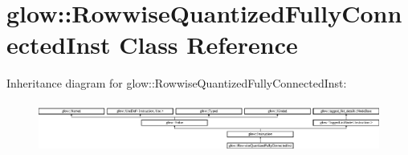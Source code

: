 \hypertarget{classglow_1_1_rowwise_quantized_fully_connected_inst}{}\section{glow\+:\+:Rowwise\+Quantized\+Fully\+Connected\+Inst Class Reference}
\label{classglow_1_1_rowwise_quantized_fully_connected_inst}
Inheritance diagram for glow\+:\+:Rowwise\+Quantized\+Fully\+Connected\+Inst\+:\begin{figure}[H]
\begin{center}
\leavevmode
\includegraphics[height=1.684211cm]{classglow_1_1_rowwise_quantized_fully_connected_inst}
\end{center}
\end{figure}
